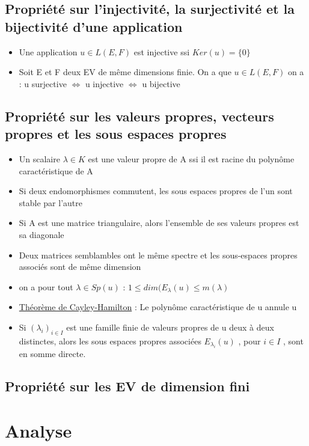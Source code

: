\documentclass{article}
\begin{document}
\subsection{Propriété sur l'injectivité, la surjectivité et la bijectivité d'une application}
\begin{itemize}[label=$\ast$]
	\item Une application \(u \in L(E,F) \) est injective ssi \(Ker(u) = \{0\} \)
	\item Soit E et F deux EV de même dimensions finie. On a que \(u \in L(E,F) \) on a :  u surjective \( \Leftrightarrow \) u injective \( \Leftrightarrow \) u bijective
\end{itemize}

\subsection{Propriété sur les valeurs propres, vecteurs propres et les sous espaces propres}
\begin{itemize}[label=$\ast$]
	\item Un scalaire \( \lambda \in K \) est une valeur propre de A ssi il est racine du polynôme caractéristique de A
	\item Si deux endomorphismes commutent, les sous espaces propres de l'un sont stable par l'autre
	\item Si A est une matrice triangulaire, alors l'ensemble de ses valeurs propres est sa diagonale
	\item Deux matrices semblambles ont le même spectre et les sous-espaces propres associés sont de même dimension
	\item on a pour tout \( \lambda \in Sp(u) \) : \( 1 \leq dim(E_{\lambda}(u) \leq m(\lambda) \)
	\item \underline{Théorème de Cayley-Hamilton} : Le polynôme caractéristique de u annule u
	\item Si \( (\lambda_i)_{i \in I} \) est une famille finie de valeurs propres de u deux à deux distinctes, alors les sous espaces propres associées \(E_{\lambda_{i}}(u)\) , pour \(i \in I \) , sont en somme directe.
\end{itemize}

\subsection{Propriété sur les EV de dimension fini}

\section{Analyse}
\end{document}
